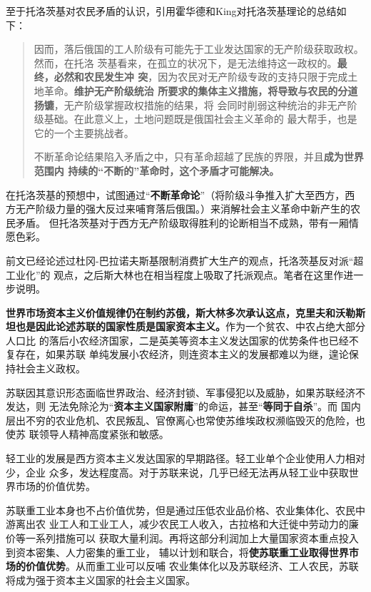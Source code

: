 至于托洛茨基对农民矛盾的认识，引用霍华德和King对托洛茨基理论的总结如下：
\begin{quotation}
  因而，落后俄国的工人阶级有可能先于工业发达国家的无产阶级获取政权。然而，在托洛
  茨基看来，在孤立的状况下，是无法维持这一政权的。\textbf{最终，必然和农民发生冲
    突}，因为农民对无产阶级专政的支持只限于完成土地革命。\textbf{维护无产阶级统治
    所要求的集体主义措施，将导致与农民的分道扬镳}，无产阶级掌握政权措施的结果，将
  会同时削弱这种统治的非无产阶级基础。在此意义上，土地问题既是俄国社会主义革命的
  最大帮手，也是它的一个主要挑战者。

  不断革命论结果陷入矛盾之中，只有革命超越了民族的界限，并且\textbf{成为世界范围内
    持续的“不断的”革命时，这个矛盾才可能解决。}
\end{quotation}
在托洛茨基的预想中，试图通过``\textbf{不断革命论}''（将阶级斗争推入扩大至西方，西
方无产阶级力量的强大反过来哺育落后俄国。）来消解社会主义革命中新产生的农民矛盾。
但托洛茨基对于西方无产阶级取得胜利的论断相当不成熟，带有一厢情愿色彩。

前文已经论述过杜冈-巴拉诺夫斯基限制消费扩大生产的观点，托洛茨基反对派``超工业化''的
观点，之后斯大林也在相当程度上吸取了托派观点。笔者在这里作进一步说明。

\textbf{世界市场资本主义价值规律仍在制约苏俄，斯大林多次承认这点，克里夫和沃勒斯
  坦也是因此论述苏联的国家性质是国家资本主义。}作为一个贫农、中农占绝大部分人口比
的落后小农经济国家，二是英美等资本主义发达国家的优势条件也已经不复存在，如果苏联
单纯发展小农经济，则连资本主义的发展都难以为继，遑论保持社会主义政权。

苏联因其意识形态面临世界政治、经济封锁、军事侵犯以及威胁，如果苏联经济不发达，则
无法免除沦为``\textbf{资本主义国家附庸}''的命运，甚至``\textbf{等同于自杀}''。而
国内层出不穷的农业危机、农民叛乱、官僚离心也常使苏维埃政权濒临毁灭的危险，也使苏
联领导人精神高度紧张和敏感。

轻工业的发展是西方资本主义发达国家的早期路径。轻工业单个企业使用人力相对少，企业
众多，发达程度高。对于苏联来说，几乎已经无法再从轻工业中获取世界市场的价值优势。

苏联重工业本身也不占价值优势，但是通过压低农业品价格、农业集体化、农民中游离出农
业工人和工业工人，减少农民工人收入，古拉格和大迁徙中劳动力的廉价等一系列措施可以
获取大量利润。再将这部分利润加上大量国家资本重点投入到资本密集、人力密集的重工业，
辅以计划和联合，将\textbf{使苏联重工业取得世界市场的价值优势}。从而重工业可以反哺
农业集体化以及苏联经济、工人农民，苏联将成为强于资本主义国家的社会主义国家。

